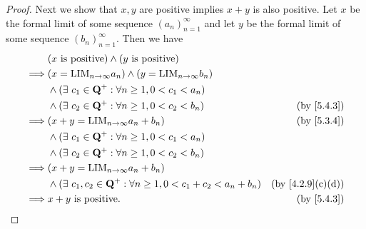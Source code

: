 \begin{proof}
  Next we show that \(x, y\) are positive implies \(x + y\) is also positive.
  Let \(x\) be the formal limit of some sequence \((a_n)_{n = 1}^{\infty}\) and let \(y\) be the formal limit of some sequence \((b_n)_{n = 1}^{\infty}\).
  Then we have
  \begin{align*}
             & (x \text{ is positive}) \land (y \text{ is positive})                                                             \\
    \implies & (x = \text{LIM}_{n \to \infty} a_n) \land (y = \text{LIM}_{n \to \infty} b_n)                                     \\
             & \land (\exists\ c_1 \in \Q^+ : \forall n \geq 1, 0 < c_1 < a_n)                                                   \\
             & \land (\exists\ c_2 \in \Q^+ : \forall n \geq 1, 0 < c_2 < b_n)                  & \text{(by \cref{5.4.3})}       \\
    \implies & (x + y = \text{LIM}_{n \to \infty} a_n + b_n)                                    & \text{(by \cref{5.3.4})}       \\
             & \land (\exists\ c_1 \in \Q^+ : \forall n \geq 1, 0 < c_1 < a_n)                                                   \\
             & \land (\exists\ c_2 \in \Q^+ : \forall n \geq 1, 0 < c_2 < b_n)                                                   \\
    \implies & (x + y = \text{LIM}_{n \to \infty} a_n + b_n)                                                                     \\
             & \land (\exists\ c_1, c_2 \in \Q^+ : \forall n \geq 1, 0 < c_1 + c_2 < a_n + b_n) & \text{(by \cref{4.2.9}(c)(d))} \\
    \implies & x + y \text{ is positive}.                                                       & \text{(by \cref{5.4.3})}
  \end{align*}


\end{proof}

